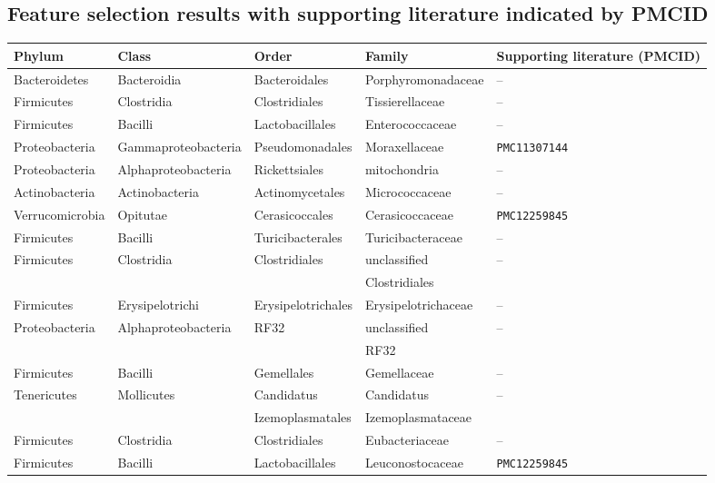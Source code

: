 \subsection{Feature selection results with supporting literature indicated by PMCID}
\begin{table}[ht]
\centering
\scriptsize
\renewcommand{\arraystretch}{1.1}
\begin{tabularx}{\textwidth}{@{}>{\raggedright\arraybackslash}X>{\raggedright\arraybackslash}X>{\raggedright\arraybackslash}X>{\raggedright\arraybackslash}X>{\raggedright\arraybackslash}X@{}}
\toprule
\textbf{Phylum} & \textbf{Class} & \textbf{Order} & \textbf{Family} & \textbf{Supporting literature (PMCID)} \\
\midrule
Bacteroidetes & Bacteroidia & Bacteroidales & Porphyromonadaceae & -- \\
Firmicutes & Clostridia & Clostridiales & Tissierellaceae & -- \\
Firmicutes & Bacilli & Lactobacillales & Enterococcaceae & -- \\
Proteobacteria & Gammaproteobacteria & Pseudomonadales & Moraxellaceae & \texttt{PMC11307144} \\
Proteobacteria & Alphaproteobacteria & Rickettsiales & mitochondria & -- \\
Actinobacteria & Actinobacteria & Actinomycetales & Micrococcaceae & -- \\
Verrucomicrobia & Opitutae & Cerasicoccales & Cerasicoccaceae & \texttt{PMC12259845} \\
Firmicutes & Bacilli & Turicibacterales & Turicibacteraceae & -- \\
Firmicutes & Clostridia & Clostridiales & unclassified & -- \\
 & & & Clostridiales & \\
Firmicutes & Erysipelotrichi & Erysipelotrichales & Erysipelotrichaceae & -- \\
Proteobacteria & Alphaproteobacteria & RF32 & unclassified & -- \\
 & & & RF32 & \\
Firmicutes & Bacilli & Gemellales & Gemellaceae & -- \\
Tenericutes & Mollicutes & Candidatus & Candidatus & -- \\
 & & Izemoplasmatales & Izemoplasmataceae & \\
Firmicutes & Clostridia & Clostridiales & Eubacteriaceae & -- \\
Firmicutes & Bacilli & Lactobacillales & Leuconostocaceae & \texttt{PMC12259845} \\

\end{tabularx}
\end{table}
